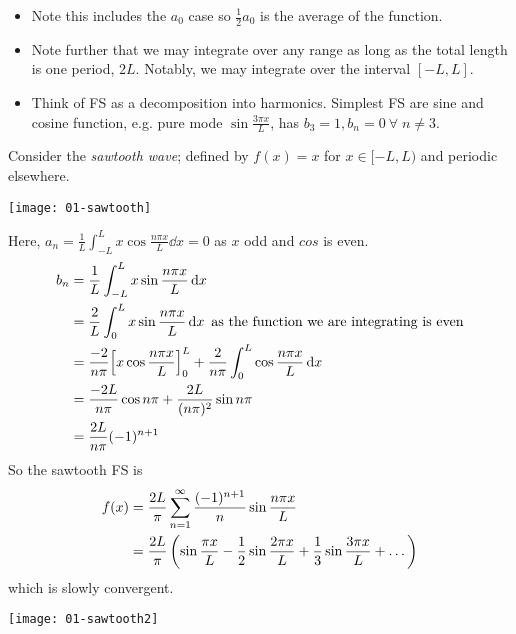     \begin{note}
        \begin{itemize}
            \item  Note this includes the $a_0$ case so $\frac{1}{2} a_0$ is the average of the function.
            \item Note further that we may integrate over any range as long as the total length is one period, $2L$.
            Notably, we may integrate over the interval $[-L, L]$.
            \item Think of FS as a decomposition into harmonics.
            Simplest FS are sine and cosine function, e.g. pure mode $\sin \frac{3 \pi x}{L}$, has $b_3 = 1, b_n = 0 \ \forall \; n \neq 3$.
        \end{itemize} 
    \end{note} 

    \begin{example}
        Consider the \textit{sawtooth wave}; defined by $f(x) = x$ for $x \in [-L, L)$ and periodic elsewhere.
        {\par \centering \texttt{[image: 01-sawtooth]} \par}
        Here,
        $a_n = \frac{1}{L} \int_{-L}^L x \cos \frac{n\pi x}{L} \dd{x} = 0$ as $x$ odd and $cos$ is even.
        \begin{align*}
            b_n &= \frac{1}{L} \int_{-L}^L x \sin \frac{n\pi x}{L} \dd{x} \\
            &= \frac{2}{L} \int_0^L x \sin \frac{n\pi x}{L} \dd{x} \text{ as the function we are integrating is even} \\
            &= \frac{-2}{n\pi} \qty[x \cos \frac{n\pi x}{L}]_0^L + \frac{2}{n\pi} \int_0^L \cos \frac{n \pi x}{L} \dd{x} \\
            &= \frac{-2L}{n\pi} \cos n \pi + \frac{2L}{(n\pi)^2} \sin n \pi \\
            &= \frac{2L}{n\pi} (-1)^{n+1}
        \end{align*}
        So the sawtooth FS is
        \begin{align} \label{eq:1.6}
            f(x) &= \frac{2L}{\pi} \sum_{n=1}^{\infty} \frac{(-1)^{n+1}}{n} \sin \frac{n \pi x}{L} \\
            &= \frac{2L}{\pi} \left( \sin \frac{\pi x}{L} - \frac{1}{2} \sin \frac{2 \pi x}{L} + \frac{1}{3} \sin \frac{3 \pi x}{L} + \dots \right) \notag
        \end{align} 
        which is slowly convergent.
        {\par \centering \texttt{[image: 01-sawtooth2]} \par}
    \end{example}

